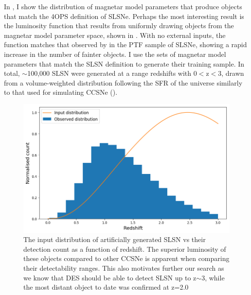 In , I show the distribution of magnetar model parameters that produce objects that match the 4OPS definition of SLSNe. Perhaps the most interesting result is the luminosity function that results from uniformly drawing objects from the magnetar model parameter space, shown in . With no external inputs, the function matches that observed by \citet{DeCia2017} in the PTF sample of SLSNe, showing a rapid increase in the number of fainter objects. I use the sets of magnetar model parameters that match the SLSN definition to generate their training sample. In total, $\sim$100,000 SLSN were generated at a range redshifts with 0$<$z$<$3, drawn from a volume-weighted distribution following the SFR of the universe \citep{Hopkins2006} similarly to that used for simulating CCSNe ().

\begin{figure}
  \includegraphics[width=\textwidth]{Figures/Chapter5/SLSN_z_dist.png}
  \caption{The input distribution of artificially generated SLSN vs their detection count as a function of redshift. The superior luminosity of these objects compared to other CCSNe is apparent when comparing their detectability ranges. This also motivates further our search as we know that DES should be able to detect SLSN up to z$\sim$3, while the most distant object to date was confirmed at z=2.0}
  \label{fig:SLSNDist}
\end{figure}

